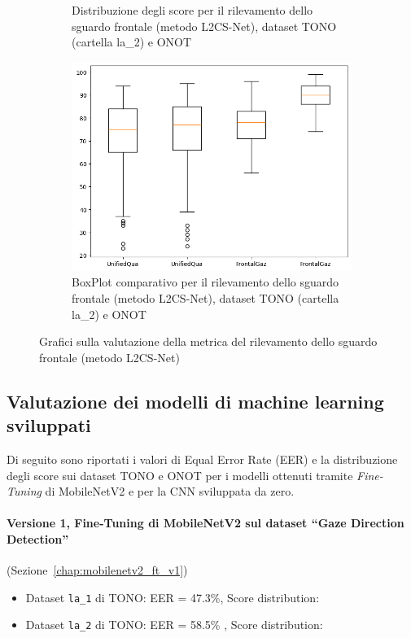 \documentclass[12pt,a4paper,openright,twoside]{book}
\begin{document}
\begin{figure}[htbp]
\begin{subfigure}{0.49\textwidth}
        \caption{Distribuzione degli score per il rilevamento dello sguardo frontale (metodo L2CS-Net), dataset TONO (cartella la\_2) e ONOT}
        \label{fig:score_distribution_tono_onot_l2_frontal_gaze_l2cs}
    \end{subfigure}
    \hfill
    \begin{subfigure}{0.49\textwidth}
        \centering
        \includegraphics[width=.7\linewidth]{figures/box-plot-tono-onot-l2-frontal-gaze-l2cs.png}
        \caption{BoxPlot comparativo per il rilevamento dello sguardo frontale (metodo L2CS-Net), dataset TONO (cartella la\_2) e ONOT}
        \label{fig:box_plot_tono_onot_l2_frontal_gaze_l2cs}
    \end{subfigure}

    \caption{Grafici sulla valutazione della metrica del rilevamento dello sguardo frontale (metodo L2CS-Net)}
\end{figure}

\subsection{Valutazione dei modelli di machine learning sviluppati}
Di seguito sono riportati i valori di Equal Error Rate (EER) e la distribuzione degli score sui dataset TONO e ONOT per i modelli ottenuti tramite \textit{Fine-Tuning} di MobileNetV2 e per la CNN sviluppata da zero.

\paragraph{Versione 1, Fine-Tuning di MobileNetV2 sul dataset ``Gaze Direction Detection''} (Sezione~\ref{chap:mobilenetv2_ft_v1})
\begin{itemize}
    \item Dataset \texttt{la\_1} di TONO:  
    EER = 47.3\%, Score distribution: 
    \item Dataset \texttt{la\_2} di TONO:  
    EER = 58.5\% , Score distribution: 
\end{itemize}
\end{document}
